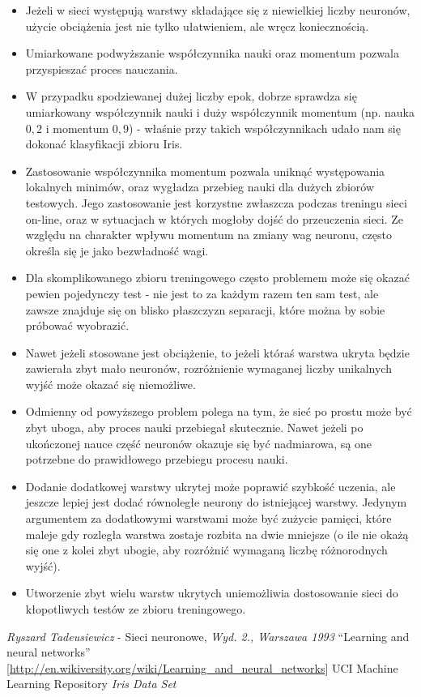 \documentclass{classrep}
\begin{document}
\begin{itemize}
\item Jeżeli w sieci występują warstwy składające się z niewielkiej liczby neuronów,
użycie obciążenia jest nie tylko ułatwieniem, ale wręcz koniecznością.
\item Umiarkowane podwyższanie współczynnika nauki oraz momentum pozwala przyspieszać
proces nauczania.
\item W przypadku spodziewanej dużej liczby epok, dobrze sprawdza się umiarkowany współczynnik
nauki i duży współczynnik momentum (np. nauka $0,2$ i momentum $0,9$) - właśnie przy
takich współczynnikach udało nam się dokonać klasyfikacji zbioru Iris.
\item Zastosowanie współczynnika momentum pozwala uniknąć występowania lokalnych minimów,
oraz wygładza przebieg nauki dla dużych zbiorów testowych. Jego zastosowanie jest korzystne
zwłaszcza podczas treningu sieci on-line, oraz w sytuacjach w których mogłoby dojść do przeuczenia sieci.
Ze względu na charakter wpływu momentum na zmiany wag neuronu, często określa się je jako bezwładność wagi.
\item Dla skomplikowanego zbioru treningowego często problemem może się okazać
pewien pojedynczy test - nie jest to za każdym razem ten sam test, ale zawsze
znajduje się on blisko płaszczyzn separacji, które można by sobie próbować wyobrazić.
\item Nawet jeżeli stosowane jest obciążenie, to jeżeli któraś warstwa ukryta
będzie zawierała zbyt mało neuronów, rozróżnienie wymaganej liczby
unikalnych wyjść może okazać się niemożliwe.
\item Odmienny od powyższego problem polega na tym, że sieć po prostu może
być zbyt uboga, aby proces nauki przebiegał skutecznie. Nawet jeżeli
po ukończonej nauce część neuronów okazuje się być nadmiarowa,
są one potrzebne do prawidłowego przebiegu procesu nauki.
\item Dodanie dodatkowej warstwy ukrytej może poprawić szybkość uczenia, ale
jeszcze lepiej jest dodać równoległe neurony do istniejącej warstwy. Jedynym
argumentem za dodatkowymi warstwami może być zużycie pamięci, które maleje
gdy rozległa warstwa zostaje rozbita na dwie mniejsze (o ile nie okażą się
one z kolei zbyt ubogie, aby rozróżnić wymaganą liczbę różnorodnych wyjść).
\item Utworzenie zbyt wielu warstw ukrytych uniemożliwia dostosowanie sieci
do kłopotliwych testów ze zbioru treningowego.
\end{itemize}

\begin{thebibliography}{0}
   \textsl{Ryszard Tadeusiewicz} - Sieci neuronowe, \textsl{Wyd. 2., Warszawa 1993}
   ``Learning and neural networks'' [\url{http://en.wikiversity.org/wiki/Learning_and_neural_networks}]
   UCI Machine Learning Repository \textsl{Iris Data Set}
\end{thebibliography}
\end{document}
